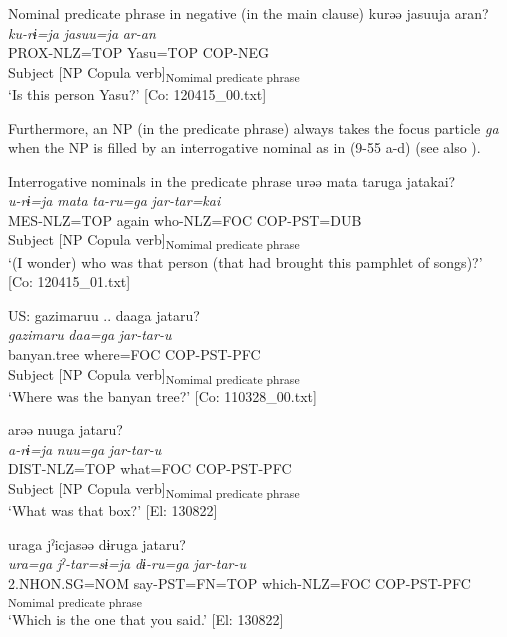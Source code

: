 \ea   Nominal predicate phrase in negative (in the main clause) \label{ex:9.54}
 \gllll  kurəə  jasuuja  aran?\\
    \textit{ku-rɨ=ja}  \textit{jasuu=ja}  \textit{ar-an}\\
    PROX-NLZ=TOP  Yasu=TOP  COP-NEG\\
    Subject  [NP  Copula verb]\textsubscript{Nomimal predicate phrase}\\
    \glt     ‘Is this person Yasu?’ [Co: 120415\_00.txt]
\z

Furthermore, an NP (in the predicate phrase) always takes the focus particle \textit{ga} when the NP is filled by an interrogative nominal as in (9-55 a-d) (see also ).

\ea   Interrogative nominals in the predicate phrase  \label{ex:9.55}
\ea %
 \gllll  urəə  mata  taruga  jatakai?\\
      \textit{u-rɨ=ja}  \textit{mata}  \textit{ta-ru=ga}  \textit{jar{}-tar=kai}\\
      MES-NLZ=TOP  again  who-NLZ=FOC  COP-PST=DUB\\
      Subject    [NP  Copula verb]\textsubscript{Nomimal predicate phrase}\\
      \glt       ‘(I wonder) who was that person (that had brought this pamphlet of songs)?’ [Co: 120415\_01.txt]

\ex \label{ex:9.55b} \gllll   US:  gazimaruu  ..  daaga  jataru?\\
      \textit{gazimaru}    \textit{daa=ga}  \textit{jar{}-tar-u}\\
      banyan.tree    where=FOC  COP-PST-PFC\\
      Subject    [NP  Copula verb]\textsubscript{Nomimal predicate phrase}\\
      \glt       ‘Where was the banyan tree?’ [Co: 110328\_00.txt]

\ex \label{ex:9.55c} %
    \gllll  arəə  nuuga  jataru?\\
      \textit{a-rɨ=ja}  \textit{nuu=ga}  \textit{jar{}-tar-u}\\
      DIST-NLZ=TOP  what=FOC  COP-PST-PFC\\
      Subject  [NP  Copula verb]\textsubscript{Nomimal predicate phrase}\\
      \glt       ‘What was that box?’ [El: 130822]

\ex \label{ex:9.55d} %
    \glll uraga  jˀicjasəə  dɨruga    jataru?\\
      \textit{ura=ga}  \textit{jˀ-tar=sɨ=ja}  \textit{dɨ-ru=ga} \textit{jar{}-tar-u}\\
      2.NHON.SG=NOM  say-PST=FN=TOP  which-NLZ=FOC  COP-PST-PFC\\                                                   
          [NP                                       Copula verb]\textsubscript{Nomimal predicate phrase}\\
      \glt ‘Which is the one that you said.’    [El: 130822]
    \z
\z

